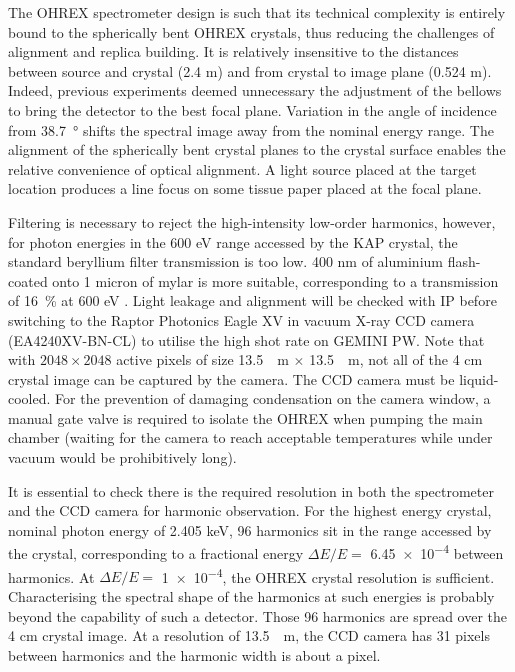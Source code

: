 The OHREX spectrometer design is such that its technical complexity is entirely bound to the spherically bent OHREX crystals, thus reducing the challenges of alignment \cite{beiersdorferLineshapeSpectroscopyVery2016} and replica building. It is relatively insensitive to the distances between source and crystal (2.4 m) and from crystal to image plane (0.524 m). Indeed, previous experiments deemed unnecessary the adjustment of the bellows to bring the detector to the best focal plane. Variation in the angle of incidence from \qty{38.7}{\degree} shifts the spectral image away from the nominal energy range. 
The alignment of the spherically bent crystal planes to the crystal surface enables the relative convenience of optical alignment. A light source placed at the target location produces a line focus on some tissue paper placed at the focal plane. 

Filtering is necessary to reject the high-intensity low-order harmonics, however, for photon energies in the 600 eV range accessed by the KAP crystal, the standard beryllium filter transmission is too low. 400 nm of aluminium flash-coated onto 1 micron of mylar is more suitable, corresponding to a transmission of \qty{16}{\%} at 600 eV \cite{henkeXRayInteractionsPhotoabsorption1993}. Light leakage and alignment will be checked with IP before switching to the Raptor Photonics Eagle XV in vacuum X-ray CCD camera (EA4240XV-BN-CL) \cite{EagleXVVacuum} to utilise the high shot rate on GEMINI PW. Note that with $2048 \times 2048$ active pixels of size \qty{13.5}{\mu m} $\times$ \qty{13.5}{\mu m}, not all of the 4 cm crystal image can be captured by the camera. The CCD camera must be liquid-cooled. For the prevention of damaging condensation on the camera window, a manual gate valve is required to isolate the OHREX when pumping the main chamber (waiting for the camera to reach acceptable temperatures while under vacuum would be prohibitively long). 

It is essential to check there is the required resolution in both the spectrometer and the CCD camera for harmonic observation. For the highest energy crystal, nominal photon energy of 2.405 keV, 96 harmonics sit in the range accessed by the crystal, corresponding to a fractional energy $\Delta E/E =$ \num{6.45e-4} between harmonics. At  $\Delta E/E =$ \num{1e-4}, the OHREX crystal resolution is sufficient. Characterising the spectral shape of the harmonics at such energies is probably beyond the capability of such a detector. Those 96 harmonics are spread over the 4 cm crystal image. At a resolution of \qty{13.5}{\mu m}, the CCD camera has 31 pixels between harmonics and the harmonic width is about a pixel.

